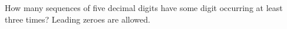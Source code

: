 How many sequences of five decimal digits have some digit occurring at least three times? Leading zeroes are allowed.
